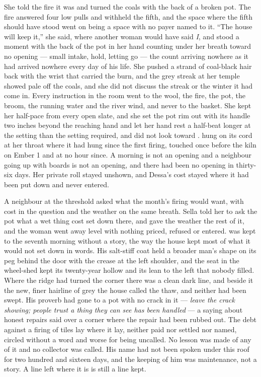 She told the fire it was  and turned the coals with the back of a broken pot. The fire answered four low pulls and withheld the fifth, and the space where the fifth should have stood went on being a space with no payer named to it. “The house will keep it,” she said, where another woman would have said \emph{I}, and stood a moment with the back of the pot in her hand counting under her breath toward no opening --- small intake, hold, letting go --- the count arriving nowhere as it had arrived nowhere every day of his life. She pushed a strand of coal-black hair back with the wrist that carried the burn, and the grey streak at her temple showed pale off the coals, and she did not discuss the streak or the winter it had come in. Every instruction in the room went to the wool, the fire, the pot, the broom, the running water and the river wind, and never to the basket. She kept her half-pace from every open slate, and she set the pot rim out with its handle two inches beyond the reaching hand and let her hand rest a half-beat longer at the setting than the setting required, and did not look toward .  hung on its cord at her throat where it had hung since the first firing, touched once before the kiln on Ember 1 and at no hour since. A morning is not an opening and a neighbour going up with boards is not an opening, and there had been no opening in thirty-six days. Her private roll stayed unshown, and Dessa's cost stayed where it had been put down and never entered.

A neighbour at the threshold asked what the month's firing would want, with cost in the question and the weather on the same breath. Sella told her to ask the pot what a wet thing cost set down there, and gave the weather the rest of it, and the woman went away level with nothing priced, refused or entered.  was kept to the seventh morning without a story, the way the house kept most of what it would not set down in words. His salt-stiff coat held a broader man's shape on its peg behind the door with the crease at the left shoulder, and the seat in the wheel-shed kept its twenty-year hollow and its lean to the left that nobody filled. Where the  ridge had turned the corner there was a clean dark line, and beside it the new, finer hairline of grey the house called the thaw, and neither had been swept. His proverb had gone to a pot with no crack in it --- \emph{leave the crack showing; people trust a thing they can see has been handled} --- a saying about honest repairs said over a corner where the repair had been rubbed out. The debt against a firing of tiles lay where it lay, neither paid nor settled nor named, circled without a word and worse for being uncalled. No lesson was made of any of it and no collector was called. His name had not been spoken under this roof for two hundred and sixteen days, and the keeping of him was maintenance, not a story. A line left where it is is still a line kept.

